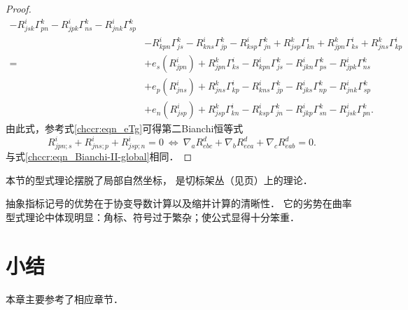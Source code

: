 \begin{proof}
\begin{align*}
        -R_{jsk}^i \Gamma_{pn}^k -R_{jpk}^i \Gamma_{ns}^k -R_{jnk}^i \Gamma_{sp}^k  \\
        & -R_{kpn}^i \Gamma_{js}^k -R_{kns}^i \Gamma_{jp}^k -R_{ksp}^i \Gamma_{jn}^k
        +R_{jsp}^k \Gamma_{kn}^i +R_{jpn}^k \Gamma_{ks}^i +R_{jns}^k \Gamma_{kp}^i  \\
        =& +e_{s} (R_{jpn}^i)+R_{jpn}^k \Gamma_{ks}^i -R_{kpn}^i \Gamma_{js}^k
        -R_{jkn}^i \Gamma_{ps}^k    -R_{jpk}^i \Gamma_{ns}^k \\
        &+e_{p} (R_{jns}^i)+R_{jns}^k \Gamma_{kp}^i  -R_{kns}^i \Gamma_{jp}^k
        -R_{jks}^i \Gamma_{np}^k       -R_{jnk}^i \Gamma_{sp}^k   \\
        &+e_{n} (R_{jsp}^i) +R_{jsp}^k \Gamma_{kn}^i -R_{ksp}^i \Gamma_{jn}^k
        -R_{jkp}^i \Gamma_{sn}^k       -R_{jsk}^i \Gamma_{pn}^k   .
    \end{align*}
    由此式，参考式\eqref{chccr:eqn_eTg}可得第二Bianchi恒等式
    \begin{equation}\label{chccr:eqn_Bianchi-II}
       R^i_{jpn;s} + R^i_{jns;p} + R^i_{jsp;n} =0 
       \ \Leftrightarrow \ 
        \nabla_a R^d_{ebc} + \nabla_b R^d_{eca}+ \nabla_c R^d_{eab} =0 .
    \end{equation}
    与式\eqref{chccr:eqn_Bianchi-II-global}相同．
\end{proof}

本节的型式理论摆脱了局部自然坐标，
是切标架丛（见\pageref{chfb:sec_tangent-frame-bundles}页）上的理论．

\begin{remark}\label{chccr:rek_abstract-i-n}
    抽象指标记号的优势在于协变导数计算以及缩并计算的清晰性．
    它的劣势在曲率型式理论中体现明显：角标、符号过于繁杂；使公式显得十分笨重．
\end{remark}




\section*{小结}
本章主要参考了\parencite{chen-li-2023-2ed-v1}相应章节．





\printbibliography[heading=subbibliography,title=第\ref{chccr}章参考文献]
\endinput